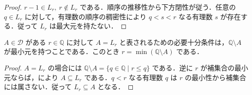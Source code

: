 \begin{proof}
$r-1\in L_r,\ r\notin L_r$ である．順序の推移性から下方閉性が従う．任意の $q\in L_r$ に対して，有理数の順序の稠密性により $q<s<r$ なる有理数 $s$ が存在する．従って $L_r$ は最大元を持たない．
\end{proof}
\begin{prop}[補集合が最小元を持つ切断]
$A\in\mathcal D$ がある $r\in\mathbb Q$ に対して $A=L_r$ と表されるための必要十分条件は，$\mathbb Q\setminus A$ が最小元を持つことである．このとき $r=\min(\mathbb Q\setminus A)$ である．
\end{prop}
\begin{proof}
$A=L_r$ の場合には $\mathbb Q\setminus A=\{q\in\mathbb Q\mid r\leq q\}$ である．逆に $r$ が補集合の最小元ならば，により $A\subseteq L_r$ である．$q<r$ なる有理数 $q$ は $r$ の最小性から補集合には属さない．従って $L_r\subseteq A$ となる．
\end{proof}

